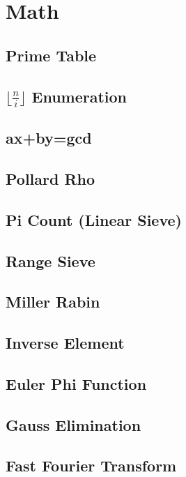 \documentclass[a4paper,10pt,twocolumn,oneside]{article}
\begin{document}
\section{Math}
\subsection{Prime Table}

\subsection{$\lfloor \frac{n}{i} \rfloor$ Enumeration}

\subsection{ax+by=gcd}

\subsection{Pollard Rho}

\subsection{Pi Count (Linear Sieve)}

\subsection{Range Sieve}

\subsection{Miller Rabin}

\subsection{Inverse Element}

\subsection{Euler Phi Function}

\subsection{Gauss Elimination}

\subsection{Fast Fourier Transform}

\end{document}
